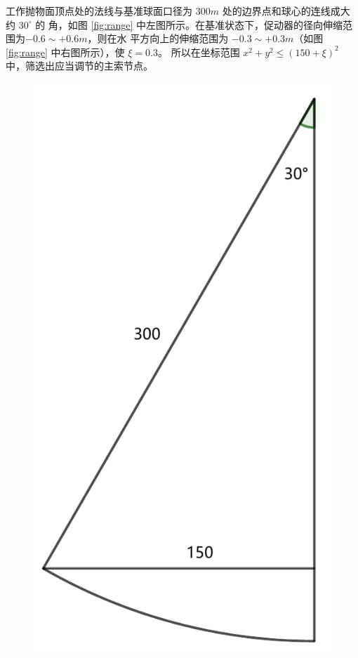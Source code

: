 \documentclass[withoutpreface,bwprint]{cumcmthesis} %
\begin{document}
工作抛物面顶点处的法线与基准球面口径为 $300m$ 处的边界点和球心的连线成大约 $30^\circ$ 的
角，如图 \ref{fig:range} 中左图所示。在基准状态下，促动器的径向伸缩范围为$-0.6\sim +0.6m$，则在水
平方向上的伸缩范围为 $-0.3\sim +0.3m$（如图 \ref{fig:range} 中右图所示），使 $\xi = 0.3$。
所以在坐标范围 $x^2 + y^2 \leqslant (150 + \xi)^2$ 中，筛选出应当调节的主索节点。
\begin{figure}[!h]
    \centering
    \begin{minipage}[c]{0.48\textwidth}
        \centering
        \includegraphics[height=0.2\textheight]{angle1.pdf}

\end{minipage}
\end{figure}
\end{document}
